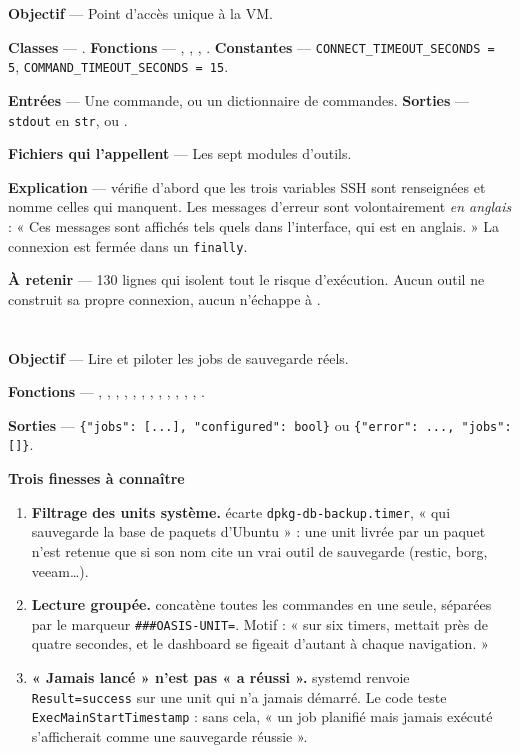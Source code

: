 \textbf{Objectif} --- Point d'accès unique à la VM.

\textbf{Classes} --- .
\textbf{Fonctions} --- , , , .
\textbf{Constantes} --- \texttt{CONNECT\_TIMEOUT\_SECONDS = 5},
\texttt{COMMAND\_TIMEOUT\_SECONDS = 15}.

\textbf{Entrées} --- Une commande, ou un dictionnaire de commandes.
\textbf{Sorties} --- \texttt{stdout} en \texttt{str}, ou .

\textbf{Fichiers qui l'appellent} --- Les sept modules d'outils.

\textbf{Explication} ---  vérifie d'abord que les trois variables
SSH sont renseignées et nomme celles qui manquent. Les messages d'erreur sont
volontairement \emph{en anglais} : « Ces messages sont affichés tels quels dans
l'interface, qui est en anglais. » La connexion est fermée dans un
\texttt{finally}.

\textbf{À retenir} --- 130 lignes qui isolent tout le risque d'exécution. Aucun
outil ne construit sa propre connexion, aucun n'échappe à .

\section{}

\textbf{Objectif} --- Lire et piloter les jobs de sauvegarde réels.

\textbf{Fonctions} --- , ,
, , ,
, , ,
, , ,
, .

\textbf{Sorties} --- \texttt{\{"jobs": [...], "configured": bool\}} ou
\texttt{\{"error": ..., "jobs": []\}}.

\textbf{Trois finesses à connaître}
\begin{enumerate}
  \item \textbf{Filtrage des units système.}  écarte
  \texttt{dpkg-db-backup.timer}, « qui sauvegarde la base de paquets d'Ubuntu »
  : une unit livrée par un paquet n'est retenue que si son nom cite un vrai
  outil de sauvegarde (restic, borg, veeam\ldots).
  \item \textbf{Lecture groupée.}  concatène toutes les
  commandes en une seule, séparées par le marqueur
  \texttt{\#\#\#OASIS-UNIT=}. Motif : « sur six timers, 
  mettait près de quatre secondes, et le dashboard se figeait d'autant à chaque
  navigation. »
  \item \textbf{« Jamais lancé » n'est pas « a réussi ».} systemd renvoie
  \texttt{Result=success} sur une unit qui n'a jamais démarré. Le code teste
  \texttt{ExecMainStartTimestamp} : sans cela, « un job planifié mais jamais
  exécuté s'afficherait comme une sauvegarde réussie ».
\end{enumerate}

